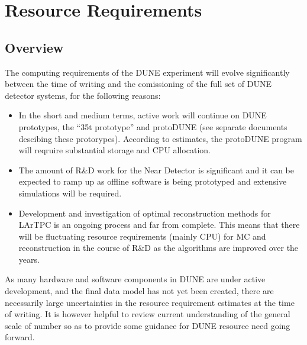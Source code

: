 \section{Resource Requirements}
\label{sec:resource-requirements}
\subsection{Overview}
The computing requirements of the DUNE experiment will evolve significantly between the time of writing
and the comissioning of the full set of DUNE detector systems, for the following reasons:
\begin{itemize}
\item In the short and medium terms, active work will continue on DUNE prototypes, the ``35t prototype'' and protoDUNE
(see separate documents descibing these protorypes). According to estimates, the protoDUNE program
will reqruire substantial storage and CPU allocation.

\item The amount of R\&D work for the Near Detector is significant and it can be expected to ramp up as offline software
is being prototyped and extensive simulations will be required.

\item Development and investigation of optimal reconstruction methods for LArTPC is an ongoing process and far from complete.
This means that there will be fluctuating resource requirements (mainly CPU) for MC and reconstruction in the course of R\&D
as the algorithms are improved over the years.

\end{itemize}

\noindent
As many hardware and software components in DUNE are under active development,
and the final data model has not yet been created, there are necessarily large uncertainties in the resource requirement estimates
at the time of writing. It is however helpful to review current understanding of the general scale of number so as to provide some
guidance for DUNE resource need going forward.



%

